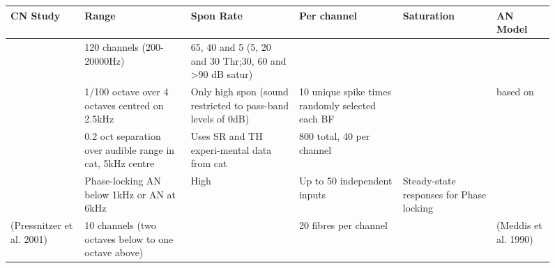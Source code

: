 \documentclass[10pt,a4paper]{article}
\begin{document}
\begin{figure}[htp]
  \centering
  \begin{minipage}{19.447cm}
    \begin{flushleft}
      \tablehead{}
      \begin{supertabular}{|m{3.148cm}|m{2.691cm}|m{2.931cm}|m{3.174cm}|m{3.18cm}|m{3.143cm}|}
        \hline
 CN Study & Range & Spon Rate & Per channel & Saturation & AN
        Model\\\hline
 \citep{ErikssonRobert:1999} & 120 channels (200-20000Hz) &
        65, 40 and 5 (5, 20 and 30 Thr;30, 60 and {\textgreater}90 dB satur) & &
        & \citep{RobertEriksson:1999}\\\hline
 \citep{ReissYoung:2005} & 1/100
        octave over 4 octaves centred on 2.5kHz & Only high spon (sound
        restricted to pass-band levels of 0dB) & 10 unique spike times randomly
        selected each BF & & \citep{BruceSachsEtAl:2003} based on
        \citep{ZhangHeinzEtAl:2001} \\\hline
 \citep{HancockVoigt:1999} & 0.2 oct
        separation over audible range in cat, 5kHz centre \citep{Liberman:1978}
        & Uses SR and TH experi-mental data from cat \citep{Liberman:1978} & 800
        total, 40 per channel & & \citep{Carney:1993}\\\hline
        \citep{ErikssonRobert:1999} &
 
        Phase-locking AN below 1kHz or AN at 6kHz & High & Up to 50 independent
        inputs & Steady-state responses for Phase locking &
        \citep{RobertEriksson:1999}\\\hline
 (Pressnitzer et al. 2001) & 10
        channels (two octaves below to one octave above) & & 20 fibres per
        channel & & (Meddis et al. 1990)\\\hline
      \end{supertabular}
    \end{flushleft}
  \end{minipage}
\end{figure}
\end{document}
